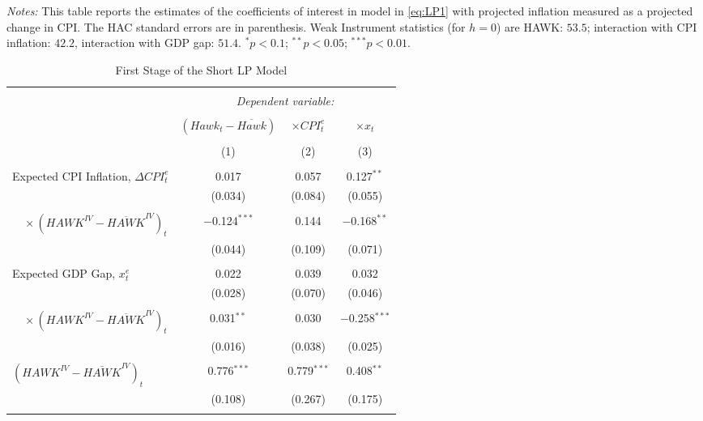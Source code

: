 \documentclass[11pt]{article}
\begin{document}
\begin{table}[!htbp]
\begin{threeparttable}
  \begin{tablenotes}[flushleft]\scriptsize
\item[] \textit{Notes:} This table reports the estimates of the coefficients of interest in model in \vref{eq:LP1} with projected inflation measured as a projected change in CPI. The \citet{Andrews1991} HAC standard errors are in parenthesis. Weak Instrument statistics (for $h=0$) are HAWK: $53.5$; interaction with CPI inflation: $42.2$, interaction with GDP gap: $51.4$. $^{*}p<0.1$; $^{**}p<0.05$; $^{***}p<0.01$.
\end{tablenotes}
\end{threeparttable}
  \end{table} 

  \begin{table}[!htbp] \centering \scriptsize
    \begin{threeparttable}
    \caption{First Stage of the Short LP Model} 
    \label{tab:fs_short} 
  \begin{tabular}{@{\extracolsep{5pt}}lccc} 
  \\[-1.8ex]\hline 
  \hline \\[-1.8ex] 
   & \multicolumn{3}{c}{\textit{Dependent variable:}} \\ 
  \cline{2-4} 
  \\[-1.8ex] & $\left(\mathit{Hawk}_t-\overline{\mathit{Hawk}}\right)$ &  $\times \mathit{CPI}_t^e$ & $\times x_{t}$ \\ 
  \\[-1.8ex] & (1) & (2) & (3)\\ 
  \hline \\[-1.8ex] 
  Expected CPI Inflation, $\Delta\mathit{CPI}_t^e$ & 0.017 & 0.057 & 0.127$^{**}$ \\ 
    & (0.034) & (0.084) & (0.055) \\ 
    & & & \\ 
    $\quad\times\left(\mathit{HAWK}^\mathit{IV}-\overline{\mathit{HAWK}}^\mathit{IV}\right)_t$ & $-$0.124$^{***}$ & 0.144 & $-$0.168$^{**}$ \\ 
    & (0.044) & (0.109) & (0.071) \\ 
    & & & \\ 
    Expected GDP Gap, $x_{t}^e$  & 0.022 & 0.039 & 0.032 \\ 
    & (0.028) & (0.070) & (0.046) \\ 
    & & & \\ 
    $\quad\times\left(\mathit{HAWK}^\mathit{IV}-\overline{\mathit{HAWK}}^\mathit{IV}\right)_t$ & 0.031$^{**}$ & 0.030 & $-$0.258$^{***}$ \\ 
    & (0.016) & (0.038) & (0.025) \\ 
    & & & \\ 
   $\left(\mathit{HAWK}^\mathit{IV}-\overline{\mathit{HAWK}}^\mathit{IV}\right)_t$ & 0.776$^{***}$ & 0.779$^{***}$ & 0.408$^{**}$ \\ 
    & (0.108) & (0.267) & (0.175) \\ 
    & & & \\ 


\end{tabular}
\end{threeparttable}
\end{table}
\end{document}
